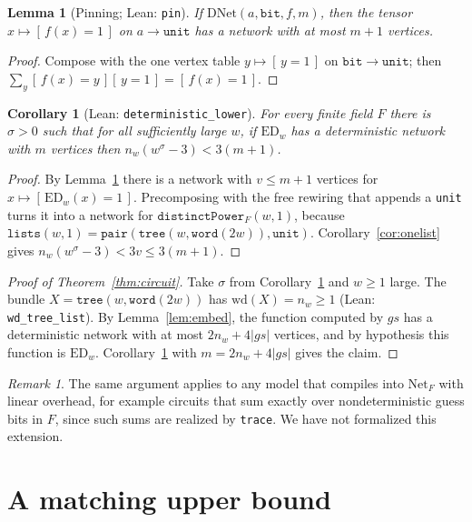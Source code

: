 \documentclass[11pt]{amsart}
\newtheorem{lemma}[theorem]{Lemma}
\newtheorem{corollary}[theorem]{Corollary}
\theoremstyle{definition}
\theoremstyle{remark}
\newtheorem{remark}[theorem]{Remark}
\newcommand{\ED}{\mathrm{ED}}
\newcommand{\lean}[1]{\texttt{#1}}
\newcommand{\Net}{\mathrm{Net}}
\newcommand{\DNet}{\mathrm{DNet}}
\newcommand{\wdt}{\mathrm{wd}}
\newcommand{\ind}[1]{[\,#1\,]}
\begin{document}
\begin{lemma}[Pinning; Lean: \lean{pin}]\label{lem:pin}
If $\DNet(a,\mathtt{bit},f,m)$, then the tensor $x\mapsto\ind{f(x)=1}$ on $a\to\mathtt{unit}$ has a network with at most $m+1$ vertices.
\end{lemma}
\begin{proof}
Compose with the one vertex table $y\mapsto\ind{y=1}$ on $\mathtt{bit}\to\mathtt{unit}$; then $\sum_y\ind{f(x)=y}\ind{y=1}=\ind{f(x)=1}$.
\end{proof}

\begin{corollary}[Lean: \lean{deterministic\_lower}]\label{cor:det}
For every finite field $F$ there is $\sigma>0$ such that for all sufficiently large $w$, if $\ED_w$ has a deterministic network with $m$ vertices then $n_w(w^{\sigma}-3)<3(m+1)$.
\end{corollary}
\begin{proof}
By Lemma~\ref{lem:pin} there is a network with $v\le m+1$ vertices for $x\mapsto\ind{\ED_w(x)=1}$. Precomposing with the free rewiring that appends a \lean{unit} turns it into a network for $\mathtt{distinctPower}_F(w,1)$, because $\mathtt{lists}(w,1)=\mathtt{pair}(\mathtt{tree}(w,\mathtt{word}(2w)),\mathtt{unit})$. Corollary~\ref{cor:onelist} gives $n_w(w^{\sigma}-3)<3v\le 3(m+1)$.
\end{proof}

\begin{proof}[Proof of Theorem~\ref{thm:circuit}]
Take $\sigma$ from Corollary~\ref{cor:det} and $w\ge 1$ large. The bundle $X=\mathtt{tree}(w,\mathtt{word}(2w))$ has $\wdt(X)=n_w\ge 1$ (Lean: \lean{wd\_tree\_list}). By Lemma~\ref{lem:embed}, the function computed by $gs$ has a deterministic network with at most $2n_w+4|gs|$ vertices, and by hypothesis this function is $\ED_w$. Corollary~\ref{cor:det} with $m=2n_w+4|gs|$ gives the claim.
\end{proof}

\begin{remark}
The same argument applies to any model that compiles into $\Net_F$ with linear overhead, for example circuits that sum exactly over nondeterministic guess bits in $F$, since such sums are realized by \lean{trace}. We have not formalized this extension.
\end{remark}

\section{A matching upper bound}\label{sec:upper}
\end{document}
